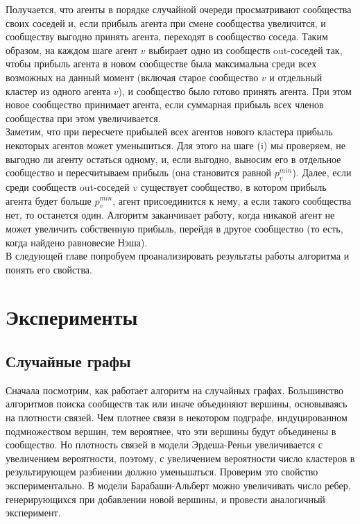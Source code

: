 Получается, что агенты в порядке случайной очереди просматривают сообщества своих соседей и, если прибыль агента при смене сообщества увеличится, и сообществу выгодно принять агента, переходят в сообщество соседа. Таким образом, на каждом шаге агент $v$ выбирает одно из сообществ out-соседей так, чтобы прибыль агента в новом сообществе была максимальна среди всех возможных на данный момент (включая старое сообщество $v$ и отдельный кластер из одного агента $v$), и сообщество было готово принять агента. При этом новое сообщество принимает агента, если суммарная прибыль всех членов сообщества при этом увеличивается.\\

Заметим, что при пересчете прибылей всех агентов нового кластера прибыль некоторых агентов может уменьшиться. Для этого на шаге (i) мы проверяем, не выгодно ли агенту остаться одному, и, если выгодно, выносим его в отдельное сообщество и пересчитываем прибыль (она становится равной $p_v^{min}$). Далее, если среди сообществ out-соседей $v$ существует сообщество, в котором прибыль агента будет больше $p_v^{min}$, агент присоединится к нему, а если такого сообщества нет, то останется один. Алгоритм заканчивает работу, когда никакой агент не может увеличить собственную прибыль, перейдя в другое сообщество (то есть, когда найдено равновесие Нэша).\\

В следующей главе попробуем проанализировать результаты работы алгоритма и понять его свойства.

\chapter{Эксперименты}
\section{Случайные графы}
Сначала посмотрим, как работает алгоритм на случайных графах. Большинство алгоритмов поиска сообществ так или иначе объединяют вершины, основываясь на плотности связей. Чем плотнее связи в некотором подграфе, индуцированном подмножеством вершин, тем вероятнее, что эти вершины будут объединены в сообщество. Но плотность связей в модели Эрдеша-Реньи увеличивается с увеличением вероятности, поэтому, с увеличением вероятности число кластеров в  результирующем разбиении должно уменьшаться. Проверим это свойство экспериментально. В модели Барабаши-Альберт можно увеличивать число ребер, генерирующихся при добавлении новой вершины, и провести аналогичный эксперимент.

